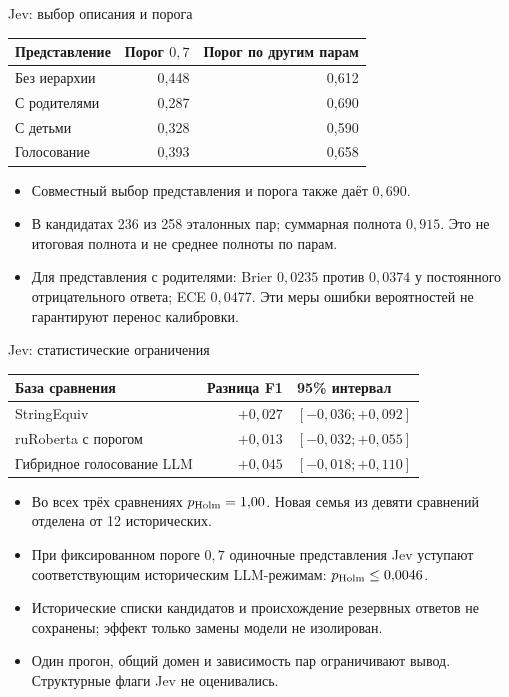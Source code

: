 \documentclass[aspectratio=169,11pt]{beamer}
\begin{document}
\renewcommand{\hseheadertext}{Дополнительные материалы}
\begin{frame}{Jev: выбор описания и порога}
  \begin{tabular}{@{}lrr@{}}
    \toprule
    Представление & Порог $0{,}7$ & Порог по другим парам \\
    \midrule
    Без иерархии & 0{,}448 & 0{,}612 \\
    С родителями & 0{,}287 & 0{,}690 \\
    С детьми & 0{,}328 & 0{,}590 \\
    Голосование & 0{,}393 & 0{,}658 \\
    \bottomrule
  \end{tabular}
  \medskip
  \begin{itemize}
    \item Совместный выбор представления и порога также даёт $0{,}690$.
    \item В кандидатах 236 из 258 эталонных пар; суммарная полнота $0{,}915$.
      Это не итоговая полнота и не среднее полноты по парам.
    \item Для представления с родителями: Brier $0{,}0235$ против
      $0{,}0374$ у постоянного отрицательного ответа; ECE $0{,}0477$.
      Эти меры ошибки вероятностей не гарантируют перенос калибровки.
  \end{itemize}
\end{frame}

\renewcommand{\hseheadertext}{Дополнительные материалы}
\begin{frame}{Jev: статистические ограничения}
  \begin{tabular}{@{}lrl@{}}
    \toprule
    База сравнения & Разница F1 & 95\% интервал \\
    \midrule
    StringEquiv & $+0{,}027$ & $[-0{,}036; +0{,}092]$ \\
    ruRoberta с порогом & $+0{,}013$ & $[-0{,}032; +0{,}055]$ \\
    Гибридное голосование LLM & $+0{,}045$ & $[-0{,}018; +0{,}110]$ \\
    \bottomrule
  \end{tabular}
  \medskip
  \begin{itemize}
    \item Во всех трёх сравнениях $p_{\rm Holm}=1{,}00$.
      Новая семья из девяти сравнений отделена от 12 исторических.
    \item При фиксированном пороге $0{,}7$ одиночные представления Jev
      уступают соответствующим историческим LLM-режимам: $p_{\rm Holm}\leq0{,}0046$.
    \item Исторические списки кандидатов и происхождение резервных ответов
      не сохранены; эффект только замены модели не изолирован.
    \item Один прогон, общий домен и зависимость пар ограничивают вывод.
      Структурные флаги Jev не оценивались.
  \end{itemize}
\end{frame}
\end{document}
